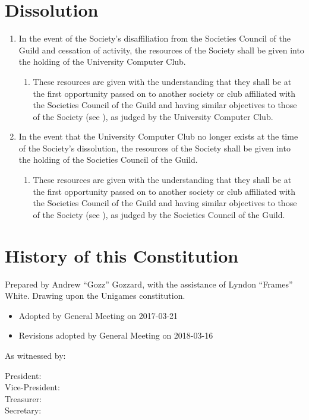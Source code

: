 \documentclass[a4paper]{article}
\begin{document}
\section{Dissolution} \label{sec:dissolution}
\begin{enumerate}
    \item In the event of the Society's disaffiliation from the Societies Council of the Guild and cessation of activity, the resources of the Society shall be given into the holding of the University Computer Club.
    \begin{enumerate}
        \item These resources are given with the understanding that they shall be at the first opportunity passed on to another society or club affiliated with the Societies Council of the Guild and having similar objectives to those of the Society (see ), as judged by the University Computer Club.
    \end{enumerate}
    \item In the event that the University Computer Club no longer exists at the time of the Society's dissolution, the resources of the Society shall be given into the holding of the Societies Council of the Guild.
    \begin{enumerate}
        \item These resources are given with the understanding that they shall be at the first opportunity passed on to another society or club affiliated with the Societies Council of the Guild and having similar objectives to those of the Society (see ), as judged by the Societies Council of the Guild.
    \end{enumerate}
\end{enumerate}

\appendixpage

\appendix \section{History of this Constitution} \label{app:history}

\noindent Prepared by Andrew ``Gozz'' Gozzard, with the assistance of Lyndon ``Frames'' White. Drawing upon the Unigames constitution.

\medskip{}

\begin{itemize}
	\item[] Adopted by General Meeting on 2017-03-21
    \item[] Revisions adopted by General Meeting on 2018-03-16
\end{itemize}

\medskip{}

\noindent As witnessed by:
\begin{description}
\item [{President:}] \hrulefill
\item [{Vice-President:}] \hrulefill
\item [{Treasurer:}] \hrulefill
\item [{Secretary:}] \hrulefill
\end{description}
\end{document}
